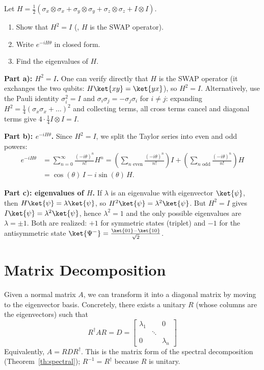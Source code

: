 \documentclass[oneside]{academica}
\begin{document}
\begin{exercise*}[The SWAP-like operator $H=\tfrac{1}{2}(\sigma_x\otimes\sigma_x+\sigma_y\otimes\sigma_y+\sigma_z\otimes\sigma_z+I\otimes I)$]
  Let $H=\tfrac{1}{2}(\sigma_x\otimes\sigma_x+\sigma_y\otimes\sigma_y+\sigma_z\otimes\sigma_z+I\otimes I)$.
  \begin{enumerate}[label=\alph*)]
    \item Show that $H^2=I$ (\ie, $H$ is the SWAP operator).
    \item Write $e^{-iH\theta}$ in closed form.
    \item Find the eigenvalues of $H$.
  \end{enumerate}

  \textbf{Part a): $H^2=I$.}
  One can verify directly that $H$ is the SWAP operator
  (it exchanges the two qubits: $H\ket{xy}=\ket{yx}$), so $H^2=I$.
  Alternatively, use the Pauli identity $\sigma_i^2=I$ and
  $\sigma_i\sigma_j=-\sigma_j\sigma_i$ for $i\neq j$: expanding
  $H^2=\tfrac{1}{4}(\sigma_x\sigma_x+\ldots)^2$ and collecting terms,
  all cross terms cancel and diagonal terms give $4\cdot\tfrac{1}{4}I\otimes I=I$.

  \textbf{Part b): $e^{-iH\theta}$.}
  Since $H^2=I$, we split the Taylor series into even and odd powers:
  \begin{align*}
    e^{-iH\theta} &= \sum_{n=0}^{\infty}\frac{(-i\theta)^n}{n!}H^n
    = \left(\sum_{n\text{ even}}\frac{(-i\theta)^n}{n!}\right)I
    + \left(\sum_{n\text{ odd}}\frac{(-i\theta)^n}{n!}\right)H \\
    &= \cos(\theta)\,I - i\sin(\theta)\,H.
  \end{align*}

  \textbf{Part c): eigenvalues of $H$.}
  If $\lambda$ is an eigenvalue with eigenvector $\ket{\psi}$, then
  $H\ket{\psi}=\lambda\ket{\psi}$, so $H^2\ket{\psi}=\lambda^2\ket{\psi}$.
  But $H^2=I$ gives $I\ket{\psi}=\lambda^2\ket{\psi}$, hence $\lambda^2=1$
  and the only possible eigenvalues are $\lambda=\pm1$.
  Both are realized: $+1$ for symmetric states (triplet) and $-1$ for
  the antisymmetric state $\ket{\Psi^-}=\tfrac{\ket{01}-\ket{10}}{\sqrt{2}}$.
\end{exercise*}

\section{Matrix Decomposition}

Given a normal matrix $A$, we can transform it into a diagonal matrix by moving to the eigenvector basis.
Concretely, there exists a unitary $R$ (whose columns are the eigenvectors) such that
\begin{equation*}
  R^\dagger A R = D = \begin{bmatrix}\lambda_1&&0\\&\ddots&\\0&&\lambda_n\end{bmatrix}
\end{equation*}
Equivalently, $A=RDR^\dagger$.
This is the matrix form of the spectral decomposition (Theorem~\ref{th:spectral}); $R^{-1}=R^\dagger$ because $R$ is unitary.
\end{document}

